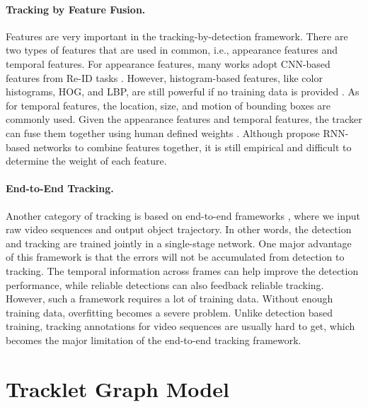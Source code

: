 \documentclass[10pt,twocolumn,letterpaper]{article}
\begin{document}
\paragraph{Tracking by Feature Fusion.} 
Features are very important in the tracking-by-detection framework. There are two types of features that are used in common, i.e., appearance features and temporal features. 
For appearance features, many works adopt CNN-based features from Re-ID tasks \cite{ristani2018features,zhang2017multi,tang2017multiple}. However, histogram-based features, like color histograms, HOG, and LBP, are still powerful if no training data is provided \cite{tang2018single}. 
As for temporal features, the location, size, and motion of bounding boxes are commonly used. 
Given the appearance features and temporal features, the tracker can fuse them together using human defined weights \cite{zhang2017multi,milan2016multi,tang2018single}. Although \cite{sadeghian2017tracking,ma2018trajectory} propose RNN-based networks to combine features together, it is still empirical and difficult to determine the weight of each feature. 


\paragraph{End-to-End Tracking.} 
Another category of tracking is based on end-to-end frameworks \cite{feichtenhofer2017detect,kang2017t,kang2016object}, where we input raw video sequences and output object trajectory. In other words, the detection and tracking are trained jointly in a single-stage network. 
One major advantage of this framework is that the errors will not be accumulated from detection to tracking. The temporal information across frames can help improve the detection performance, while reliable detections can also feedback reliable tracking. However, such a framework requires a lot of training data. Without enough training data, overfitting becomes a severe problem. Unlike detection based training, tracking annotations for video sequences are usually hard to get, which becomes the major limitation of the end-to-end tracking framework.


\section{Tracklet Graph Model}
\label{sec:graph-model}
\end{document}
